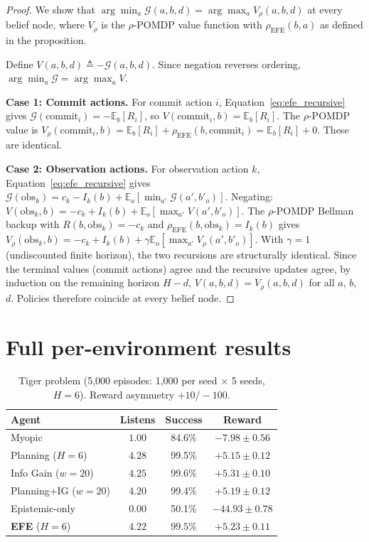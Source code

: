 \documentclass{article}
\begin{document}
\begin{proof}
We show that $\arg\min_a \mathcal{G}(a, b, d) = \arg\max_a V_\rho(a, b, d)$ at every belief node, where $V_\rho$ is the $\rho$-POMDP value function with $\rho_{\mathrm{EFE}}(b, a)$ as defined in the proposition.

Define $V(a, b, d) \triangleq -\mathcal{G}(a, b, d)$. Since negation reverses ordering, $\arg\min_a \mathcal{G} = \arg\max_a V$.

\textbf{Case 1: Commit actions.} For commit action $i$, Equation~\ref{eq:efe_recursive} gives $\mathcal{G}(\text{commit}_i) = -\mathbb{E}_b[R_i]$, so $V(\text{commit}_i, b) = \mathbb{E}_b[R_i]$. The $\rho$-POMDP value is $V_\rho(\text{commit}_i, b) = \mathbb{E}_b[R_i] + \rho_{\mathrm{EFE}}(b, \text{commit}_i) = \mathbb{E}_b[R_i] + 0$. These are identical.

\textbf{Case 2: Observation actions.} For observation action $k$, Equation~\ref{eq:efe_recursive} gives
$\mathcal{G}(\text{obs}_k) = c_k - I_k(b) + \mathbb{E}_o[\min_{a'} \mathcal{G}(a', b'_o)].$
Negating:
$V(\text{obs}_k, b) = -c_k + I_k(b) + \mathbb{E}_o[\max_{a'} V(a', b'_o)].$
The $\rho$-POMDP Bellman backup with $R(b, \text{obs}_k) = -c_k$ and $\rho_{\mathrm{EFE}}(b, \text{obs}_k) = I_k(b)$ gives
$V_\rho(\text{obs}_k, b) = -c_k + I_k(b) + \gamma \mathbb{E}_o[\max_{a'} V_\rho(a', b'_o)].$
With $\gamma = 1$ (undiscounted finite horizon), the two recursions are structurally identical. Since the terminal values (commit actions) agree and the recursive updates agree, by induction on the remaining horizon $H - d$, $V(a, b, d) = V_\rho(a, b, d)$ for all $a$, $b$, $d$. Policies therefore coincide at every belief node.
\end{proof}

\section{Full per-environment results}
\label{app:full_tables}

\begin{table}[h]
\centering
\caption{Tiger problem (5{,}000 episodes: 1{,}000 per seed $\times$ 5 seeds, $H{=}6$). Reward asymmetry $+10 / {-}100$.}
\begin{small}
\begin{tabular}{lccc}
\toprule
Agent & Listens & Success & Reward \\
\midrule
Myopic & $1.00$ & 84.6\% & $-7.98 \pm 0.56$ \\
Planning ($H{=}6$) & $4.28$ & 99.5\% & $+5.15 \pm 0.12$ \\
Info Gain ($w{=}20$) & $4.25$ & 99.6\% & $+5.31 \pm 0.10$ \\
Planning+IG ($w{=}20$) & $4.20$ & 99.4\% & $+5.19 \pm 0.12$ \\
Epistemic-only & $0.00$ & 50.1\% & $-44.93 \pm 0.78$ \\
\textbf{EFE} ($H{=}6$) & $\mathbf{4.22}$ & $\mathbf{99.5\%}$ & $\mathbf{+5.23 \pm 0.11}$ \\
\bottomrule
\end{tabular}
\end{small}
\end{table}
\end{document}
